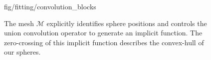 \begin{figure}[t!]
\begin{overpic} 
[width=\linewidth]
{fig/fitting/convolution_blocks}
\end{overpic}
\caption{
% 
The mesh {\small$\mathcal{M}$} explicitly identifies sphere positions and controls the union convolution operator to generate an implicit function. The zero-crossing of this implicit function describes the convex-hull of our spheres. 
% 
% 
}
\label{fig:convsurf}
\end{figure}
